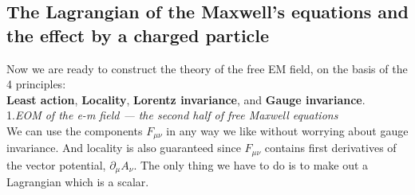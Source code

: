 \documentclass{article}
\newcommand{\p}{\partial}
\newcommand{\1}{\left}
\newcommand{\2}{\right}
\newcommand{\m}{\mu}
\newcommand{\n}{\nu}
\begin{document}
\subsection{The Lagrangian of the Maxwell's equations and the effect by a charged particle}

Now we are ready to construct the theory of the free EM field, on the basis of the 4 principles:\\ \textbf{Least action}, \textbf{Locality}, \textbf{Lorentz invariance}, and \textbf{Gauge invariance}.\\

1.\textsl{EOM of the e-m field --- the second half of free Maxwell equations}\\

We can use the components $F_{\m\n}$ in any way we like without worrying about gauge invariance. And locality is also guaranteed since $F_{\m\n}$ contains first derivatives of the vector potential, $\p_\m A_\n$. The only thing we have to do is to make out a Lagrangian which is a scalar.
\end{document}
